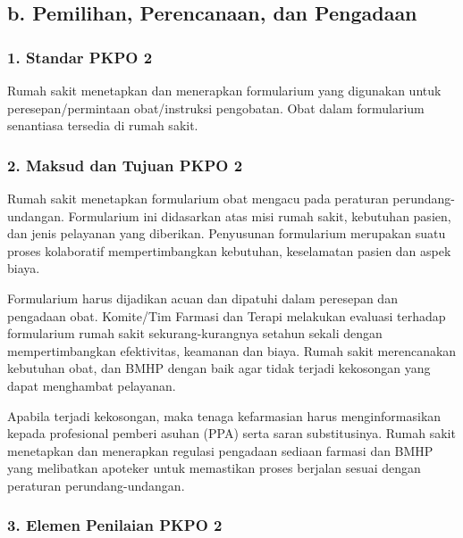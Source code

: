 \documentclass[
]{book}
\begin{document}
\hypertarget{b.-pemilihan-perencanaan-dan-pengadaan}{%
\subsection*{b. Pemilihan, Perencanaan, dan Pengadaan}\label{b.-pemilihan-perencanaan-dan-pengadaan}}

\hypertarget{standar-pkpo-2}{%
\subsubsection*{1. Standar PKPO 2}\label{standar-pkpo-2}}

Rumah sakit menetapkan dan menerapkan formularium yang digunakan untuk peresepan/permintaan obat/instruksi pengobatan. Obat dalam formularium senantiasa tersedia di rumah sakit.

\hypertarget{maksud-dan-tujuan-pkpo-2}{%
\subsubsection*{2. Maksud dan Tujuan PKPO 2}\label{maksud-dan-tujuan-pkpo-2}}

Rumah sakit menetapkan formularium obat mengacu pada peraturan perundang-undangan. Formularium ini didasarkan atas misi rumah sakit, kebutuhan pasien, dan jenis pelayanan yang diberikan. Penyusunan formularium merupakan suatu proses kolaboratif mempertimbangkan kebutuhan, keselamatan pasien dan aspek biaya.

Formularium harus dijadikan acuan dan dipatuhi dalam peresepan dan pengadaan obat. Komite/Tim Farmasi dan Terapi melakukan evaluasi terhadap formularium rumah sakit sekurang-kurangnya setahun sekali dengan mempertimbangkan efektivitas, keamanan dan biaya. Rumah sakit merencanakan kebutuhan obat, dan BMHP dengan baik agar tidak terjadi kekosongan yang dapat menghambat pelayanan.

Apabila terjadi kekosongan, maka tenaga kefarmasian harus menginformasikan kepada profesional pemberi asuhan (PPA) serta saran substitusinya. Rumah sakit menetapkan dan menerapkan regulasi pengadaan sediaan farmasi dan BMHP yang melibatkan apoteker untuk memastikan proses berjalan sesuai dengan peraturan perundang-undangan.

\hypertarget{elemen-penilaian-pkpo-2}{%
\subsubsection*{3. Elemen Penilaian PKPO 2}\label{elemen-penilaian-pkpo-2}}
\end{document}
